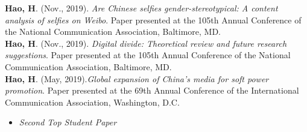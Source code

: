 
\begin{rSection}{}
\textbf{Hao, H}. (Nov., 2019). \textit{Are Chinese selfies gender-stereotypical: A content analysis of selfies on Weibo}. Paper presented at the 105th Annual Conference of the National Communication Association, Baltimore, MD. \\[3pt]
\textbf{Hao, H}. (Nov., 2019). \textit{Digital divide: Theoretical review and future research suggestions}. Paper presented at the 105th Annual Conference of the National Communication Association, Baltimore, MD. \\[3pt]
\textbf{Hao, H}. (May, 2019).\textit{Global expansion of China’s media for soft power promotion}. Paper presented at the 69th Annual Conference of the International Communication Association, Washington, D.C. 
\begin{itemize}
  \item[] \vspace{-0.5em}  \hspace{0.5em} \emph{Second Top Student Paper}
\end{itemize}

\end{rSection}